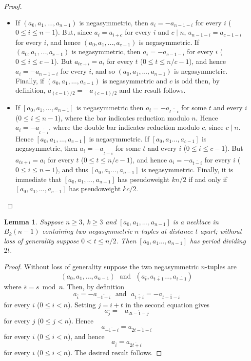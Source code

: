 \documentclass[a4paper,11pt]{article}
\theoremstyle{plain}
\newtheorem{lemma}{Lemma}[section]
\theoremstyle{definition}
\theoremstyle{remark}
\begin{document}
\begin{proof}
\begin{itemize}

\item[(i)] If $(a_0,a_1,\dots,a_{n-1})$ is negasymmetric, then $a_i=-a_{n-1-i}$ for every $i$
    ($0\leq i\leq n-1$).  But, since $a_{i}=a_{i+c}$ for every $i$ and $c\mid n$,
    $a_{n-1-i}=a_{c-1-i}$ for every $i$, and hence $(a_0,a_1,\dots,a_{c-1})$ is negasymmetric.
    If $(a_0,a_1,\dots,a_{c-1})$ is negasymmetric, then $a_i=-a_{c-1-i}$ for every $i$ ($0\leq
    i\leq c-1$).  But $a_{tc+i}=a_{i}$ for every $t$ ($0\leq t\leq n/c-1$), and hence
    $a_i=-a_{n-1-i}$ for every $i$, and so $(a_0,a_1,\dots,a_{n-1})$ is negasymmetric. Finally,
    if $(a_0,a_1,\dots,a_{c-1})$ is negasymmetric and $c$ is odd then, by definition,
    $a_{(c-1)/2}=-a_{(c-1)/2}$ and the result follows.

\item[(ii)] If $[a_0,a_1,\dots,a_{n-1}]$ is negasymmetric then $a_i=-a_{\overline{t-i}}$ for
    some $t$ and every $i$ ($0\leq i\leq n-1$), where the bar indicates reduction modulo $n$.
    Hence $a_i=-a_{\overline{\overline{t-i}}}$, where the double bar indicates reduction modulo
    $c$, since $c\mid n$.  Hence $[a_0,a_1,\dots,a_{c-1}]$ is negasymmetric. If
    $[a_0,a_1\dots,a_{c-1}]$ is negasymmetric, then $a_i=-a_{\overline{\overline{t-i}}}$ for
    some $t$ and every $i$ ($0\leq i\leq c-1$). But $a_{tc+i}=a_{i}$ for every $t$ ($0\leq
    t\leq n/c-1$), and hence $a_i=-a_{\overline{t-i}}$ for every $i$ ($0\leq i\leq n-1$), and
    thus $[a_0,a_1\dots,a_{n-1}]$ is negasymmetric. Finally, it is immediate that
    $[a_0,a_1,\dots,a_{n-1}]$ has pseudoweight $kn/2$ if and only if $[a_0,a_1,\dots,a_{c-1}]$
    has pseudoweight $kc/2$.
\end{itemize}
\end{proof}

\begin{lemma}  \label{lemma:multiple_negasymmetric_tuples}
Suppose $n\geq3$, $k\geq3$ and $[a_0,a_1,\dots,a_{n-1}]$ is a necklace in $B_k(n-1)$ containing two
negasymmetric $n$-tuples at distance $t$ apart; without loss of generality suppose $0<t\leq n/2$.
Then $[a_0,a_1\dots,a_{n-1}]$ has period dividing $2t$.
\end{lemma}

\begin{proof}
Without loss of generality suppose the two negasymmetric $n$-tuples are
\[ (a_0,a_1,\dots,a_{n-1}) \text{~~and~~} (a_{\overline{t}},a_{\overline{t+1}}\dots,a_{\overline{t-1}}) \]
where $\overline{s}=s\bmod n$.  Then, by definition
\[ a_{\overline{i}}=-a_{\overline{-1-i}} \text{~~and~~} a_{\overline{t+i}}=-a_{\overline{t-1-i}} \]
for every $i$ ($0\leq i<n$).  Setting $j=i+t$ in the second equation gives
\[ a_{\overline{j}}=-a_{\overline{2t-1-j}} \]
for every $j$ ($0\leq j<n$).  Hence
\[ a_{\overline{-1-i}} = a_{\overline{2t-1-i}} \]
for every $i$ ($0\leq i<n$), and hence
\[ a_{\overline{i}} = a_{\overline{2t+i}} \]
for every $i$ ($0\leq i<n$). The desired result follows.
\end{proof}
\end{document}
